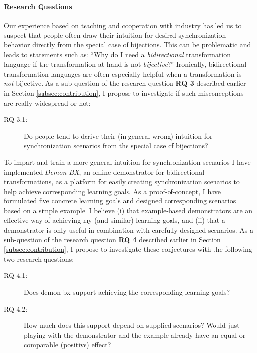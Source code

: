 \paragraph{Research Questions}
Our experience based on teaching and cooperation with industry has led us to suspect that people often draw their intuition for desired synchronization behavior directly from the special case of bijections.
This can be problematic and leads to statements such as: ``Why do I need a \emph{bidirectional} transformation language if the transformation at hand is not \emph{bijective}?''
Ironically, bidirectional transformation languages are often especially helpful when a transformation is \emph{not} bijective. As a sub-question of the research question \textbf{RQ 3} described earlier in Section \ref{subsec:contribution}, I propose to investigate if such misconceptions are really widespread or not:

\begin{description}
	\item[RQ 3.1:] Do people tend to derive their (in general wrong) intuition for synchronization scenarios from the special case of bijections?
\end{description}

To impart and train a more general intuition for synchronization scenarios I have implemented \textit{Demon-BX}, an online demonstrator for bidirectional transformations, as a platform for easily creating synchronization scenarios to help achieve corresponding learning goals.
As a proof-of-concept, I have formulated five concrete learning goals and designed corresponding scenarios based on a simple example. I believe (i) that example-based demonstrators are an effective way of achieving my (and similar) learning goals, and (ii) that a demonstrator is only useful in combination with carefully designed scenarios. As a sub-question of the research question \textbf{RQ 4} described earlier in Section \ref{subsec:contribution}, I propose to investigate these conjectures with the following two research questions: 

\begin{description}
	\item[RQ 4.1:] Does demon-bx support achieving the corresponding learning goals?
	\item[RQ 4.2:] How much does this support depend on supplied scenarios?  Would just playing with the demonstrator and the example already have an equal or comparable (positive) effect?
\end{description}

